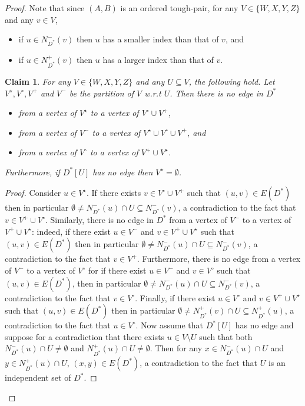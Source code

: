 \documentclass[a4paper,11pt]{article}
\theoremstyle{plain}
\newtheorem{claim}[theorem]{Claim}
\newtheorem{identification rule}{Identification Rule}
\theoremstyle{definition}
\theoremstyle{remark}
\newenvironment{claimproof}{\begin{proof}\renewcommand{\qedsymbol}{\claimqed}}{\end{proof}\renewcommand{\qedsymbol}{\plainqed}}
\let\plainqed\qedsymbol
\newcommand{\claimqed}{$\lrcorner$}
\newcommand{\toughpair}{tough-pair}
\begin{document}
\begin{proof}
Note that since $(A,B)$ is an ordered \toughpair, for any $V \in \{W,X,Y,Z\}$ and any $v \in V$, 
\begin{itemize}
\item if $u \in N^-_{D^*}(v)$ then $u$ has a smaller index than that of $v$, and
\item if $u \in N^+_{D^*}(v)$ then $u$ has a larger index than that of $v$. 
\end{itemize}

\begin{claim}
\label{clm:independent}
For any $V \in \{W,X,Y,Z\}$ and any $U \subseteq V$, the following hold.
Let $V^\star, V^\circ, V^+$ and $V^-$ be the partition of $V$ w.r.t $U$. Then there is no edge in $D^*$
\begin{itemize}
\item[(i)] from a vertex of $V^\star$ to a vertex of $V^\circ \cup V^+$, 
\item[(ii)] from a vertex of $V^-$ to a vertex of $V^\star \cup V^\circ \cup V^+$, and 
\item[(iii)] from a vertex of $V^\circ$ to a vertex of $V^+ \cup V^\star$.
\end{itemize}
Furthermore, if $D^*[U]$ has no edge then $V^\star = \emptyset$.
\end{claim}

\begin{claimproof}
Consider $u \in V^\star$. If there exists $v \in V^\circ \cup V^+$ such that $(u,v) \in E(D^*)$ then in particular $\emptyset \neq N^-_{D^*}(u) \cap U \subseteq N^-_{D^*}(v)$, a contradiction to the fact that $v \in V^+ \cup V^\circ$.
Similarly, there is no edge in $D^*$ from a vertex of $V^-$ to a vertex of $V^+ \cup V^\star$: indeed, if there exist $u \in V^-$ and $v\in V^+ \cup V^\star$ such that $(u,v) \in E(D^*)$ then in particular $\emptyset \neq N^-_{D^*}(u) \cap U \subseteq N^-_{D^*}(v)$, a contradiction to the fact that $v \in V^+$. Furthermore, there is no edge from a vertex of $V^-$ to a vertex of $V^\circ$ for if there exist $u \in V^-$ and $v \in V^\circ$ such that $(u,v) \in E(D^*)$, then in particular $\emptyset \neq N^-_{D^*}(u) \cap U \subseteq N^-_{D^*}(v)$, a contradiction to the fact that $v \in V^\circ$. Finally, if there exist $u \in V^\circ$ and $v \in V^+ \cup V^\star$ such that $(u,v) \in E(D^*)$ then in particular $\emptyset \neq N^+_{D^*}(v) \cap U \subseteq N^+_{D^*}(u)$, a contradiction to the fact that $u \in V^\circ$.
Now assume that $D^*[U]$ has no edge and suppose for a contradiction that there exists $u \in V \setminus U$ such that both $N^-_{D^*}(u) \cap U \neq \emptyset$ and $N^+_{D^*}(u) \cap U \neq \emptyset$. Then for any $x \in N^-_{D^*}(u) \cap U$ and $y \in N^+_{D^*}(u) \cap U$, $(x,y) \in E(D^*)$, a contradiction to the fact that $U$ is an independent set of $D^*$. 
\end{claimproof}


\end{proof}
\end{document}
